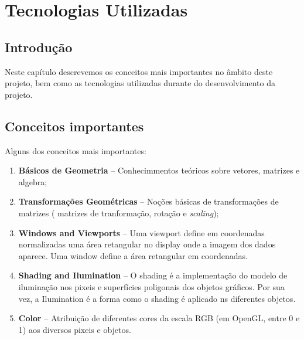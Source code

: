 \chapter{Tecnologias Utilizadas}
\label{chap:estado-da-arte}

\section{Introdução}
\label{chap2:sec:intro}
Neste capítulo descrevemos  os  conceitos mais  importantes  no âmbito  deste  projeto,  bem  como  as  tecnologias utilizadas durante do desenvolvimento da projeto. 

\section{Conceitos importantes}
\label{chap2:sec:citacoes}

Alguns dos conceitos mais importantes:
\begin{enumerate}
    \item \textbf{Básicos de Geometria} -- Conhecimmentos teóricos sobre vetores, matrizes e algebra;
    \item \textbf{Transformações Geométricas} -- Noções básicas de transformações de matrizes ( matrizes de tranformação, rotação e \textit{scaling});
    \item \textbf{Windows and Viewports} -- Uma viewport define em coordenadas normalizadas uma área retangular no display onde a imagem dos dados aparece. Uma window define a área retangular em coordenadas.
    \item \textbf{Shading and Ilumination} -- O shading é a implementação do modelo de iluminação nos pixeis e superfícies poligonais dos objetos gráficos. Por sua vez, a Ilumination é a forma como o shading é aplicado ns diferentes objetos.
    \item \textbf{Color} -- Atribuição de diferentes cores da escala RGB (em OpenGL, entre 0 e 1) aos diversos pixeis e objetos.
\end{enumerate}

